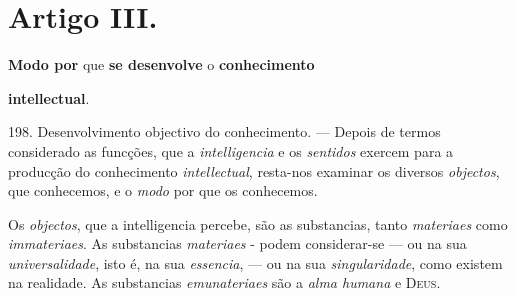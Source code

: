 
\section*{Artigo III.}

    \textbf{Modo por} que \textbf{se desenvolve} o \textbf{conhecimento}

\textbf{intellectual}.

198. Desenvolvimento objectivo do conhecimento. --- Depois de termos considerado as funcções, que a \emph{intelligencia} e os \emph{sentidos} exercem para a producção do conhecimento \emph{intellectual}, resta-nos   examinar os diversos \emph{objectos}, que conhecemos, e o \emph{modo} por que os conhecemos.

Os \emph{objectos}, que a intelligencia percebe, são as substancias, tanto \emph{materiaes} como \emph{immateriaes}. As substancias \emph{materiaes} - podem considerar-se --- ou na sua \emph{universalidade}, isto é, na sua \emph{essencia}, --- ou na sua \emph{singularidade}, como existem na realidade. As substancias \emph{emunateriaes} são a \emph{alma humana} e \textsc{Deus}.

